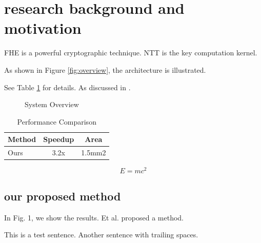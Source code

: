 \documentclass{article}
\begin{document}
\section{research background and motivation}
\label{background}

FHE is a powerful cryptographic technique.
NTT is the key computation kernel.

As shown in Figure \ref{fig:overview},
the architecture is illustrated.

See Table \cref{tab:results} for details.
As discussed in \cite{cinnamon2025}.

\begin{figure}
\centering
\label{overview}
\caption{System Overview}
\end{figure}

\begin{table}[htbp]
\caption{Performance Comparison}
\label{tab:results}
\begin{tabular}{lcc}
\hline
Method & Speedup & Area \\
\hline
Ours & 3.2x & 1.5mm2 \\
\hline
\end{tabular}
\end{table}

\begin{equation}
E = mc^2
\label{eq:unused}
\end{equation}

\subsection{our proposed method}

In Fig. 1, we show the results.
Et al. proposed a method.

This is  a  test  sentence.
Another sentence with trailing spaces.    


\end{document}
